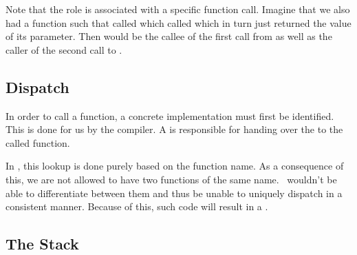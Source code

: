 \inputminted[]{csharp}{../src/csharp/functions/roles/Program.cs}

Note that the role is associated with a specific function call. Imagine that we also had a function  such that  called  which called  which in turn just returned the value of its parameter. Then  would be the callee of the first call from  as well as the caller of the second call to .

\subsection{Dispatch}

In order to call a function, a concrete implementation must first be identified. This is done for us by the compiler. A  is responsible for handing over the  to the called function.

In \csharp, this lookup is done purely based on the function name. As a consequence of this, we are not allowed to have two functions of the same name. \csharp\ wouldn't be able to differentiate between them and thus be unable to uniquely dispatch in a consistent manner. Because of this, such code will result in a .

\subsection{The Stack}

